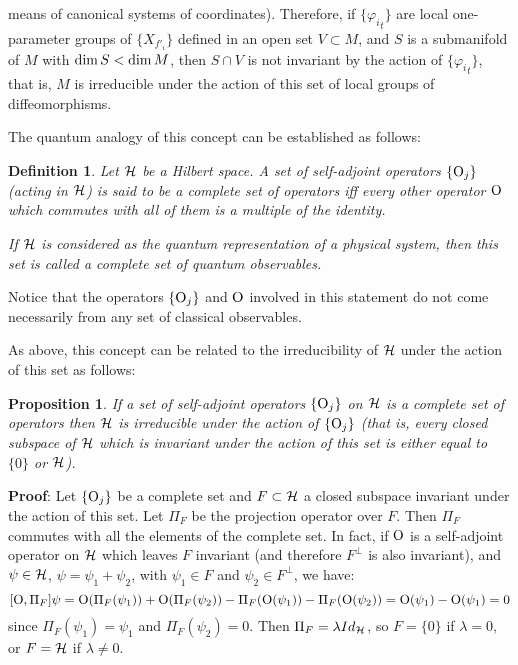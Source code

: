 \documentclass[12pt]{article}
\newtheorem{prop}{Proposition}
\newtheorem{definition}{Definition}
\def\qed{\ifvmode\removelastskip\fi
{\unskip\nobreak\hfil\penalty50\hbox{}\nobreak\hfil
\hbox{\vrule height1.2ex width1.2ex}\parfillskip=0pt
\finalhyphendemerits=0 \par\smallskip}}
\def\H{{\cal H}}
\def\Op{{\rm O}}
\begin{document}
means
of canonical systems of coordinates).
Therefore, if $\{ {\varphi_i}_t \}$ are local one-parameter
groups of $\{ X_{f'_i} \}$ defined in an open set $V \subset M$,
and $S$ is a submanifold of $M$ with ${\rm dim}\, S<{\rm dim}\, M$,
then $S \cap V$ is not invariant by the action of
$\{ {\varphi_i}_t \}$, that is, $M$ is irreducible under the action of
this
set of local groups of diffeomorphisms.

The quantum analogy of this concept can be established as follows:

\begin{definition}
Let $\H$ be a Hilbert space.
A set of self-adjoint operators $\{ \Op_j \}$ (acting in $\H$)
is said to be a {\rm complete set of operators}
iff every other operator $\Op$ which commutes with
all of them is a multiple of the identity.

If $\H$ is considered as the quantum representation of
a physical system, then this set is called a
{\rm complete set of quantum observables}.
\end{definition}

Notice that the operators $\{ \Op_j \}$ and $\Op$
involved in this statement do not come necessarily
 from any set of classical observables.

As above, this concept can be  related to the irreducibility of $\H$
under
the action of this set as follows:

\begin{prop}
If a set of self-adjoint operators
$\{ \Op_j \}$ on $\H$ is a complete set of operators
then $\H$ is irreducible under the action of $\{ \Op_j \}$
(that is, every closed subspace of $\H$ which is invariant
under the action of this set is either equal to $\{ 0 \}$ or $\H$).
\end{prop}
{\bf Proof}: 
Let $\{ \Op_j \}$ be a complete set and $F \subset \H$
a closed subspace invariant under the action
of this set. Let $\Pi_F$ be the projection operator
over $F$. Then $\Pi_F$ commutes with all the elements of
the complete set. In fact, if $\Op$ is a self-adjoint operator on $\H$
which leaves $F$ invariant (and therefore $F^\perp$ is also invariant),
and $\psi \in \H$, $\psi = \psi_1+\psi_2$,
with $\psi_1 \in F$ and $\psi_2 \in F^\perp$, we have:
$$
[\Op ,\Pi_F]\psi =
\Op (\Pi_F (\psi_1))+\Op (\Pi_F (\psi_2))-
\Pi_F(\Op (\psi_1))-\Pi_F(\Op (\psi_2)) =
\Op (\psi_1) -\Op (\psi_1) = 0
$$
since $\Pi_F (\psi_1) = \psi_1$ and $\Pi_F (\psi_2) = 0$.
Then $\Pi_F=\lambda Id_{\H}$, so $F=\{ 0\}$ if $\lambda =0$,
or $F=\H$ if $\lambda\not= 0$.
\qed
\end{document}
